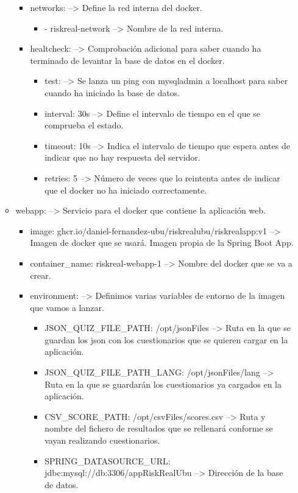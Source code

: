 \begin{itemize}
\begin{itemize}
\begin{itemize}
\begin{itemize}
			\end{itemize}
			\item networks: --> Define la red interna del docker.
			\begin{itemize}
				\item - riskreal-network --> Nombre de la red interna.
			\end{itemize}
			\item healtcheck: --> Comprobación adicional para saber cuando ha terminado de levantar la base de datos en el docker.
			\begin{itemize}
				\item test: --> Se lanza un ping con mysqladmin a localhost para saber cuando ha iniciado la base de datos.
				\item interval: 30s --> Define el intervalo de tiempo en el que se comprueba el estado.
				\item timeout: 10s --> Indica el intervalo de tiempo que espera antes de indicar que no hay respuesta del servidor.
				\item retries: 5 --> Número de veces que lo reintenta antes de indicar que el docker no ha iniciado correctamente.
			\end{itemize}
		\end{itemize}
		\item webapp: --> Servicio para el docker que contiene la aplicación web.
		\begin{itemize}
			\item image: ghcr.io/daniel-fernandez-ubu/riskrealubu/riskrealapp:v1 --> Imagen de docker que se usará. Imagen propia de la Spring Boot App.
			\item container\_name: riskreal-webapp-1 --> Nombre del docker que se va a crear.
			\item environment: --> Definimos varias variables de entorno de la imagen que vamos a lanzar.
				\begin{itemize}
				 	\item JSON\_QUIZ\_FILE\_PATH: /opt/jsonFiles --> Ruta en la que se guardan los json con los cuestionarios que se quieren cargar en la aplicación.
					\item JSON\_QUIZ\_FILE\_PATH\_LANG: /opt/jsonFiles/lang --> Ruta en la que se guardarán los cuestionarios ya cargados en la aplicación.
					\item CSV\_SCORE\_PATH: /opt/csvFiles/scores.csv --> Ruta y nombre del fichero de resultados que se rellenará conforme se vayan realizando cuestionarios.
					 \item SPRING\_DATASOURCE\_URL: jdbc:mysql://db:3306/appRiskRealUbu --> Dirección de la base de datos.

\end{itemize}
\end{itemize}
\end{itemize}
\end{itemize}
